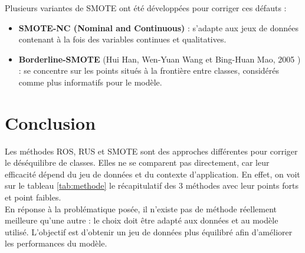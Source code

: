 \documentclass{article}
\begin{document}
Plusieurs variantes de SMOTE ont été développées pour corriger ces défauts :
\begin{itemize}
    \item \textbf{SMOTE-NC (Nominal and Continuous)} : s’adapte aux jeux de données contenant à la fois des variables continues et qualitatives.
    \item \textbf{Borderline-SMOTE} (Hui Han, Wen-Yuan Wang et Bing-Huan Mao, 2005 ) : se concentre sur les points situés à la frontière entre classes, considérés comme plus informatifs pour le modèle.
\end{itemize}

\vspace{1cm}


\section{Conclusion}

Les méthodes ROS, RUS et SMOTE sont des approches différentes pour corriger le déséquilibre de classes. Elles ne se comparent pas directement, car leur efficacité dépend du jeu de données et du contexte d’application.
En effet, on voit sur le tableau \ref{tab:methode} le récapitulatif des 3 méthodes avec leur points forts et point faibles. \\
En réponse à la problématique posée, il n’existe pas de méthode réellement meilleure qu'une autre : le choix doit être adapté aux données et au modèle utilisé.
L’objectif est d’obtenir un jeu de données plus équilibré afin d’améliorer les performances du modèle.\\
\end{document}

